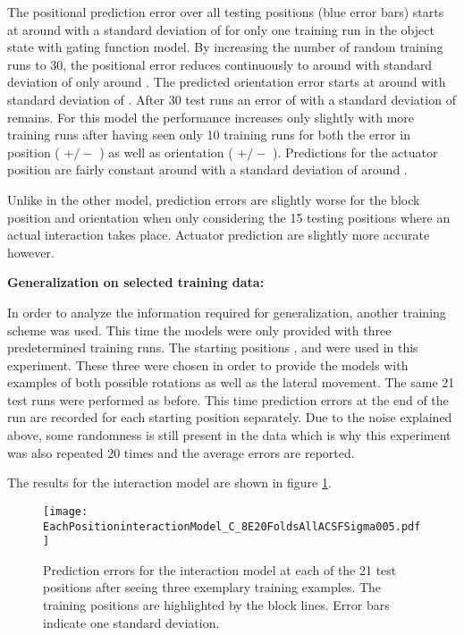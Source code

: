 The positional prediction error over all testing positions (blue error bars) starts at around  with a standard deviation of  for only one training run in the object state with gating function model. By increasing the number of random training runs to 30, the positional error reduces continuously to around  with standard deviation of only around .
The predicted orientation error starts at around  with standard deviation of .
After 30 test runs an error of  with a standard deviation of  remains.
For this model the performance increases only slightly with more training runs after having seen only 10 training runs for both the error in position ( $+/-$ ) as well as orientation ( $+/-$ ).
Predictions for the actuator position are fairly constant around  with a standard deviation of around .

Unlike in the other model, prediction errors are slightly worse for the block position and orientation when only considering the 15 testing positions where an actual interaction takes place. Actuator prediction are slightly more accurate however.


\textbf{Generalization on selected training data:}

In order to analyze the information required for generalization, another training scheme was used. This time the models were only provided with three predetermined training runs. The starting positions ,  and  were used in this experiment. These three were chosen in order to provide the models with examples of both possible rotations as well as the lateral movement. The same 21 test runs were performed as before. This time prediction errors at the end of the run are recorded for each starting position separately. Due to the noise explained above, some randomness is still present in the data which is why this experiment was also repeated 20 times and the average errors are reported. 

The results for the interaction model are shown in figure \ref{fig:eachPosInteraction}.

\begin{figure}
\centering
\texttt{[image: EachPositioninteractionModel\_C\_8E20FoldsAllACSFSigma005.pdf]}
\caption{Prediction errors for the interaction model at each of the 21 test positions after seeing three exemplary training examples. The training positions are highlighted by the block lines. Error bars indicate one standard deviation.}
\label{fig:eachPosInteraction}
\end{figure}

